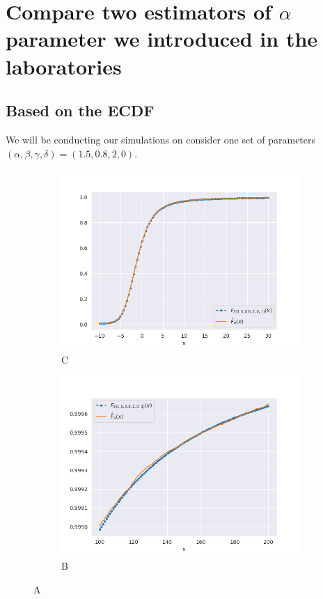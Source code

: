 \documentclass{article}
\begin{document}
		\section{Compare two estimators of $\alpha$ parameter we introduced in the laboratories}
		\subsection{Based on the ECDF}
		We will be conducting our simulations on consider one set of parameters $(\alpha, \beta , \gamma, \delta) = (1.5, 0.8, 2, 0)$.
		\begin{figure}

			\begin{subfigure}{.5\textwidth}
				\centering
				\includegraphics[width=1\linewidth]{images/stable_CDF.png}
				\caption{C}
			\end{subfigure}
			\begin{subfigure}[r]{.5\textwidth}
				\centering
				\includegraphics[width=1\linewidth]{images/stable_CDF_large_x.png}
				\caption{B}
			\end{subfigure}
			\caption{A}
			\label{fig:same_n_max}
		\end{figure}
\end{document}
